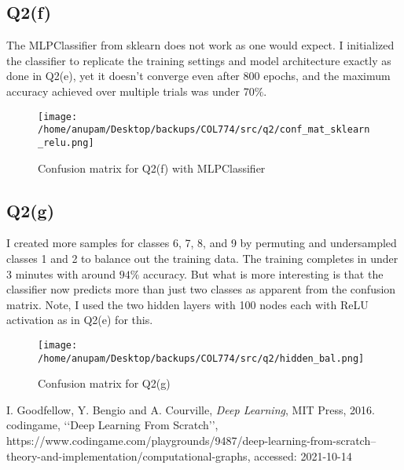 \documentclass[11pt]{article}
\begin{document}
\subsection{Q2(f)}
\label{sec-2-6}
The MLPClassifier from sklearn does not work as one would expect. I
initialized the classifier to replicate the training settings and
model architecture exactly as done in Q2(e), yet it doesn't converge
even after 800 epochs, and the maximum accuracy achieved over multiple
trials was under 70\(\%\).
\begin{figure}[!ht]
\texttt{[image: /home/anupam/Desktop/backups/COL774/src/q2/conf\_mat\_sklearn\_relu.png]}
	\caption{Confusion matrix for Q2(f) with MLPClassifier}
\end{figure}
\subsection{Q2(g)}
\label{sec-2-7}
I created more samples for classes 6, 7, 8, and 9 by permuting and
undersampled classes 1 and 2 to balance out the training data. The
training completes in under 3 minutes with around \(94\%\)
accuracy. But what is more interesting is that the classifier now
predicts more than just two classes as apparent from the confusion
matrix. Note, I used the two hidden layers with 100 nodes each with
ReLU activation as in Q2(e) for this.
\begin{figure}[!ht]
\texttt{[image: /home/anupam/Desktop/backups/COL774/src/q2/hidden\_bal.png]}
	\caption{Confusion matrix for Q2(g)}
\end{figure}


\clearpage
\begin{thebibliography}{9}
 I. Goodfellow, Y. Bengio and A. Courville, \emph{Deep Learning}, MIT Press, 2016.
 codingame, \lq\lq Deep Learning From Scratch\rq\rq, https://www.codingame.com/playgrounds/9487/deep-learning-from-scratch--theory-and-implementation/computational-graphs, accessed: 2021-10-14
\end{thebibliography}
\end{document}
